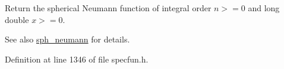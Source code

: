 Return the spherical Neumann function of integral order $ n >= 0 $ and {\ttfamily long double} $ x >= 0 $.

\begin{DoxySeeAlso}{See also}
\hyperlink{group__tr29124__math__spec__func_ga01cdd716aaca8ff3c08f307800fd5220}{sph\+\_\+neumann} for details. 
\end{DoxySeeAlso}


Definition at line 1346 of file specfun.\+h.

